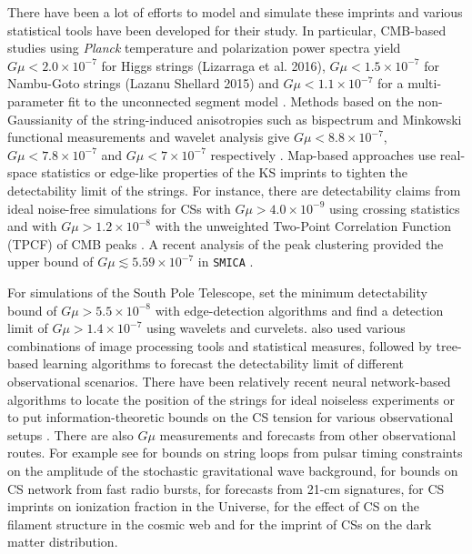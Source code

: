 \documentclass[fleqn,usenatbib]{mnras}
\begin{document}
There have been a lot of efforts to model and simulate these imprints and various statistical tools have been developed for their study.
In particular, CMB-based studies using {\it Planck} temperature and polarization power spectra yield 
 $G\mu < 2.0\times 10^{-7}$ for Higgs strings (Lizarraga et al. 2016), $G\mu < 1.5\times 10^{-7}$  for  Nambu-Goto strings (Lazanu  Shellard 2015) and  $G\mu < 1.1\times 10^{-7}$  for a multi-parameter fit to the unconnected segment model \citep{cha16}. 
Methods based on the non-Gaussianity of the string-induced anisotropies  \citep{rin10,duc12} such as bispectrum and Minkowski functional measurements and wavelet analysis  give 
$G\mu < 8.8\times10^{-7}$, $ G\mu < 7.8\times10^{-7}$ and $G\mu < 7\times10^{-7}$ respectively \citep{hin09,hin10,reg15,ade2014planck,duc12}.
%
Map-based approaches use real-space statistics  or  edge-like properties of the KS imprints to tighten the detectability limit of the strings.  
%
For instance, there are detectability claims from  ideal noise-free simulations for CSs with $G\mu > 4.0\times 10^{-9}$  using crossing statistics \citep{mov10}
and with  $G\mu > 1.2 \times 10^{-8} $ with the unweighted Two-Point Correlation Function (TPCF) of CMB peaks \citep{mov12}. A recent analysis of the peak clustering  provided the upper bound of  $G\mu\lesssim 5.59\times 10^{-7}$  in \texttt{SMICA} \citep{vafaei2021clustering}.

%
For simulations of the South Pole Telescope, \cite{ste08} set the minimum detectability bound of  $G\mu >  5.5\times10^{-8}$ with edge-detection algorithms and  \cite{her16} find a detection limit of $G\mu >  1.4\times10^{-7}$ using wavelets and curvelets. 
%
\cite{vaf17} also used various combinations of image processing tools and statistical measures,  followed by tree-based learning algorithms \citep{vaf18}  to forecast the detectability limit of different observational scenarios. 
%
There have been relatively recent neural network-based algorithms to 
locate the position of the strings for ideal noiseless experiments \citep{ciu17} or to put information-theoretic bounds on the CS tension for various observational setups \citep{ciu20}.
%
There are  also $G\mu$ measurements and forecasts from other observational routes. For example see \cite{rin17,bla17a,bla17b,arz18,bla18,auc19,len15,jen06,psh09,tun10,dam05,bat10,kur12} for bounds on string loops from pulsar timing constraints on the amplitude of the stochastic gravitational wave background, \cite{imt20} for bounds on CS network from fast radio bursts, \cite{bra10,her12,pag12} for forecasts from  21-cm signatures, \cite{lal19} for CS imprints on ionization fraction in the Universe, \cite{fer20} for the effect of CS on the filament structure in the cosmic web and \cite{cun18} for the imprint of CSs on the dark matter distribution.
\end{document}
